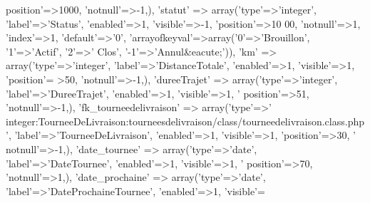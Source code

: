 \begin{DoxyCode}
{      position'}=>1000, \textcolor{stringliteral}{'notnull'}=>-1,),
        \textcolor{stringliteral}{'statut'} => array(\textcolor{stringliteral}{'type'}=>\textcolor{stringliteral}{'integer'}, \textcolor{stringliteral}{'label'}=>\textcolor{stringliteral}{'Status'}, \textcolor{stringliteral}{'enabled'}=>1, \textcolor{stringliteral}{'visible'}=>-1, \textcolor{stringliteral}{'position'}=>10
      00, \textcolor{stringliteral}{'notnull'}=>1, \textcolor{stringliteral}{'index'}=>1, \textcolor{stringliteral}{'default'}=>\textcolor{charliteral}{'0'}, \textcolor{stringliteral}{'arrayofkeyval'}=>array(\textcolor{charliteral}{'0'}=>\textcolor{stringliteral}{'Brouillon'}, \textcolor{charliteral}{'1'}=>\textcolor{stringliteral}{'Actif'}, \textcolor{charliteral}{'2'}=>\textcolor{stringliteral}{'
      Clos'}, \textcolor{stringliteral}{'-1'}=>\textcolor{stringliteral}{'Annul&eacute;'})),
        \textcolor{stringliteral}{'km'} => array(\textcolor{stringliteral}{'type'}=>\textcolor{stringliteral}{'integer'}, \textcolor{stringliteral}{'label'}=>\textcolor{stringliteral}{'DistanceTotale'}, \textcolor{stringliteral}{'enabled'}=>1, \textcolor{stringliteral}{'visible'}=>1, \textcolor{stringliteral}{'position'}=
      >50, \textcolor{stringliteral}{'notnull'}=>-1,),
        \textcolor{stringliteral}{'dureeTrajet'} => array(\textcolor{stringliteral}{'type'}=>\textcolor{stringliteral}{'integer'}, \textcolor{stringliteral}{'label'}=>\textcolor{stringliteral}{'DureeTrajet'}, \textcolor{stringliteral}{'enabled'}=>1, \textcolor{stringliteral}{'visible'}=>1, \textcolor{stringliteral}{'
      position'}=>51, \textcolor{stringliteral}{'notnull'}=>-1,),
        \textcolor{stringliteral}{'fk\_tourneedelivraison'} => array(\textcolor{stringliteral}{'type'}=>\textcolor{stringliteral}{'
      integer:TourneeDeLivraison:tourneesdelivraison/class/tourneedelivraison.class.php'}, \textcolor{stringliteral}{'label'}=>\textcolor{stringliteral}{'TourneeDeLivraison'}, \textcolor{stringliteral}{'enabled'}=>1, \textcolor{stringliteral}{'visible'}=>1, \textcolor{stringliteral}{'position'}=>30, \textcolor{stringliteral}{'
      notnull'}=>-1,),
        \textcolor{stringliteral}{'date\_tournee'} => array(\textcolor{stringliteral}{'type'}=>\textcolor{stringliteral}{'date'}, \textcolor{stringliteral}{'label'}=>\textcolor{stringliteral}{'DateTournee'}, \textcolor{stringliteral}{'enabled'}=>1, \textcolor{stringliteral}{'visible'}=>1, \textcolor{stringliteral}{'
      position'}=>70, \textcolor{stringliteral}{'notnull'}=>1,),
        \textcolor{stringliteral}{'date\_prochaine'} => array(\textcolor{stringliteral}{'type'}=>\textcolor{stringliteral}{'date'}, \textcolor{stringliteral}{'label'}=>\textcolor{stringliteral}{'DateProchaineTournee'}, \textcolor{stringliteral}{'enabled'}=>1, \textcolor{stringliteral}{'visible'}=

\end{DoxyCode}
